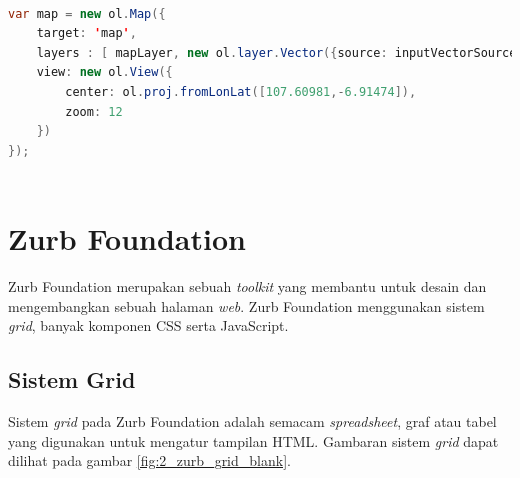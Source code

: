 \begin{lstlisting}[caption=Menambahkan vektor pada peta,label = {lst_2_ol_map},language=Java]
	
var map = new ol.Map({
    target: 'map',
    layers : [ mapLayer, new ol.layer.Vector({source: inputVectorSource}), new ol.layer.Vector({source: resultVectorSource}) ],
    view: new ol.View({
        center: ol.proj.fromLonLat([107.60981,-6.91474]),
        zoom: 12
    })
});
		
\end{lstlisting}

\section{Zurb Foundation}
\label{sec:zurbfoundation}
%

Zurb Foundation \cite{zurbfoundationbook} merupakan sebuah \textit{toolkit} yang membantu untuk desain dan mengembangkan sebuah halaman \textit{web}. Zurb Foundation menggunakan sistem \textit{grid}, banyak komponen CSS serta JavaScript. 

\subsection{Sistem Grid}
Sistem \textit{grid} pada Zurb Foundation adalah semacam \textit{spreadsheet}, graf atau tabel yang digunakan untuk mengatur tampilan HTML. Gambaran sistem \textit{grid} dapat dilihat pada gambar \ref{fig:2_zurb_grid_blank}.


